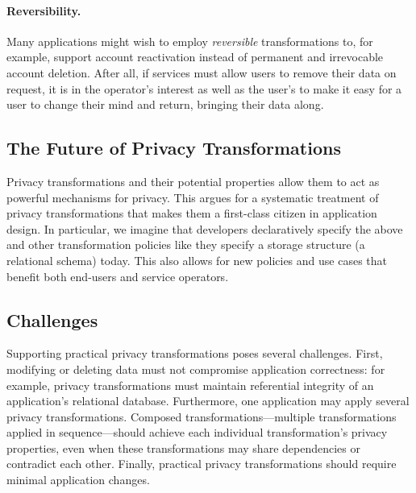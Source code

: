 \paragraph{Reversibility.}
%
Many applications might wish to employ \emph{reversible} transformations to, for example, support
account reactivation instead of permanent and irrevocable account deletion.
%
After all, if services must allow users to remove their data on request, it is in the operator's
interest as well as the user's to make it easy for a user to change their mind and return, bringing their data along.
%
%
%
%

\subsection{The Future of Privacy Transformations}
%
%
Privacy transformations and their potential properties allow them to act as powerful mechanisms for
privacy. This argues for a systematic treatment of privacy transformations that makes them a
first-class citizen in application design.
%
In particular, we imagine that developers declaratively specify the above and other
transformation policies like they specify a storage structure (\eg a relational schema) today.
%
This also allows for new policies and use cases that benefit both end-users and service operators.
%
%

\subsection{Challenges}
%
Supporting practical privacy transformations poses several challenges. First, modifying
or deleting data must not compromise application correctness: for example, privacy transformations
must maintain referential integrity of an application's relational database.
%
Furthermore, one application may apply several privacy transformations. Composed
transformations---multiple transformations applied in sequence---should achieve each individual
transformation's privacy properties, even when these transformations may share dependencies or
contradict each other.
%
Finally, practical privacy transformations should require minimal application changes.
%

